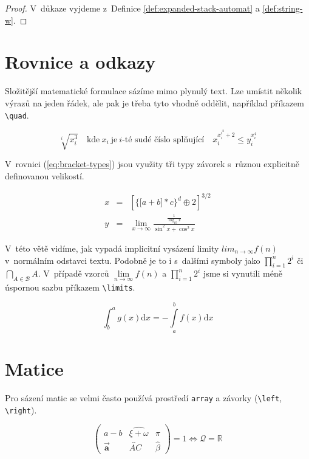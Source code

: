 \documentclass[a4paper, 11pt, twocolumn, final]{article}
\theoremstyle{definition}
\theoremstyle{plain}
\begin{document}
\begin{proof}
    V~důkaze vyjdeme z~Definice \ref{def:expanded-stack-automat}
    a \ref{def:string-w}.
\end{proof}

\section{Rovnice a odkazy}

Složitější matematické formulace sázíme mimo plynulý text. Lze umístit několik
výrazů na jeden řádek, ale pak je třeba tyto vhodně oddělit, například
příkazem \verb|\quad|.

$$\sqrt[i]{x_{i}^3} \quad \text{kde}\ x_i\ \text{je}\ i\text{-té sudé číslo splňující}
\quad x_{i}^{x_{i}^{i^2} + 2} \leq y_{i}^{x_{i}^4}$$

V~rovnici (\ref{eq:bracket-types}) jsou využity tři typy závorek s~různou
explicitně definovanou velikostí.

\begin{eqnarray}
    \label{eq:bracket-types}
    x &= & \left[\Big\{\big[a + b\big] \ast c\Big\}^d \oplus 2\right]^{3/2}\\
    \nonumber y &= & \lim_{x \rightarrow \infty} \frac{\frac{1}{\log_{10} x}}
    {\sin^2 x + \cos^2 x}
\end{eqnarray}

V~této větě vidíme, jak vypadá implicitní vysázení limity $lim_{n \rightarrow
\infty} f(n)$ v~normálním odstavci textu. Podobně je to i s~dalšími symboly
jako $\prod_{i = 1}^n 2^i$ či $\bigcap_{A \in \mathcal{B}} A$. V~případě
vzorců $\lim\limits_{n \rightarrow \infty} f(n)$ a $\prod\limits_{i = 1}^n 2^i$
jsme si vynutili méně úspornou sazbu příkazem \verb|\limits|.

\begin{equation}
    \label{eq:integrals}
    \int_b^a g(x)\mathrm{d}x = -\int\limits_a^b f(x)\mathrm{d}x
\end{equation}

\section{Matice}

Pro sázení matic se velmi často používá prostředí \texttt{array} a závorky
(\verb|\left|, \verb|\right|).

$$\left( \begin{array}{ccc}
         a - b   & \widehat{\xi + \omega}  & \pi \\
         \vec{\mathbf{a}} & \overleftrightarrow{AC} & \hat{\beta}
    \end{array} \right) = 1 \Longleftrightarrow \mathcal{Q} = \mathbb{R}$$
\end{document}

